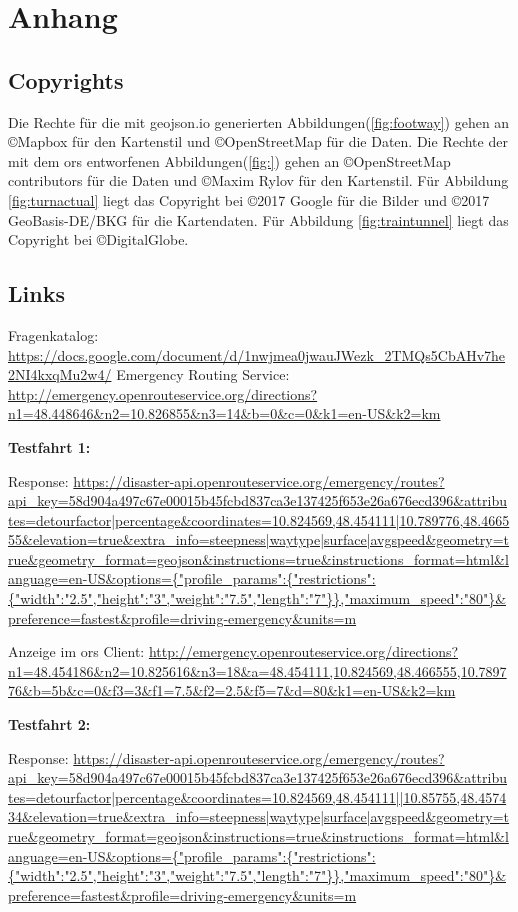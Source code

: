 \section{Anhang}
\label{sec:anhang}
\subsection*{Copyrights}
Die Rechte für die mit geojson.io generierten Abbildungen(\ref{fig:footway}) gehen an \copyright Mapbox für den Kartenstil und \copyright OpenStreetMap für die Daten.
Die Rechte der mit dem \gls{ors} entworfenen Abbildungen(\ref{fig:}) gehen an \copyright OpenStreetMap contributors für die Daten und \copyright Maxim Rylov für den Kartenstil.
Für Abbildung \ref{fig:turnactual} liegt das Copyright bei \copyright 2017 Google für die Bilder und \copyright 2017 GeoBasis-DE/BKG für die Kartendaten.
Für Abbildung \ref{fig:traintunnel} liegt das Copyright bei \copyright DigitalGlobe.

\subsection*{Links}
Fragenkatalog:
\url{https://docs.google.com/document/d/1nwjmea0jwauJWezk_2TMQs5CbAHv7he2NI4kxqMu2w4/}
\smallskip
Emergency Routing Service:
\url{http://emergency.openrouteservice.org/directions?n1=48.448646&n2=10.826855&n3=14&b=0&c=0&k1=en-US&k2=km}

\textbf{Testfahrt 1:}

Response:
\url{https://disaster-api.openrouteservice.org/emergency/routes?api_key=58d904a497c67e00015b45fcbd837ca3e137425f653e26a676ecd396&attributes=detourfactor|percentage&coordinates=10.824569,48.454111|10.789776,48.466555&elevation=true&extra_info=steepness|waytype|surface|avgspeed&geometry=true&geometry_format=geojson&instructions=true&instructions_format=html&language=en-US&options={"profile_params":{"restrictions":{"width":"2.5","height":"3","weight":"7.5","length":"7"}},"maximum_speed":"80"}&preference=fastest&profile=driving-emergency&units=m}

Anzeige im \gls{ors} Client:
\url{http://emergency.openrouteservice.org/directions?n1=48.454186&n2=10.825616&n3=18&a=48.454111,10.824569,48.466555,10.789776&b=5b&c=0&f3=3&f1=7.5&f2=2.5&f5=7&d=80&k1=en-US&k2=km}

\textbf{Testfahrt 2:}

Response:
\url{https://disaster-api.openrouteservice.org/emergency/routes?api_key=58d904a497c67e00015b45fcbd837ca3e137425f653e26a676ecd396&attributes=detourfactor|percentage&coordinates=10.824569,48.454111||10.85755,48.457434&elevation=true&extra_info=steepness|waytype|surface|avgspeed&geometry=true&geometry_format=geojson&instructions=true&instructions_format=html&language=en-US&options={"profile_params":{"restrictions":{"width":"2.5","height":"3","weight":"7.5","length":"7"}},"maximum_speed":"80"}&preference=fastest&profile=driving-emergency&units=m}

